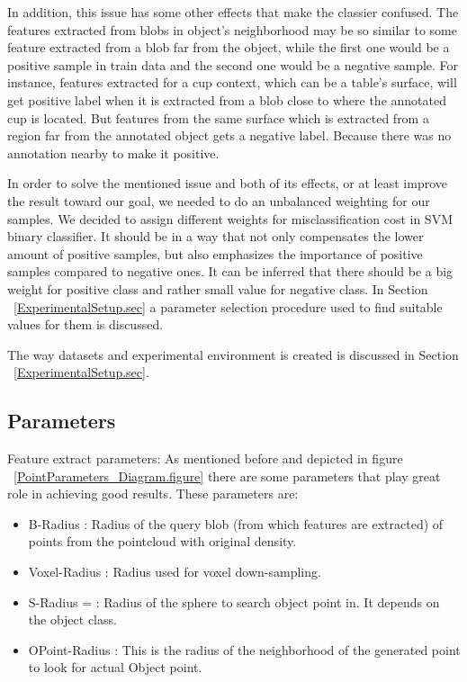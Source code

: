 In addition, this issue has some other effects that make the classier confused. 
The features extracted from blobs in object's neighborhood may be so similar to some feature extracted from a blob far from the 
object, while the first one would be a positive sample in train data and the second one would be a negative sample. 
For instance, features extracted for a cup context, which can be a table's surface, will get positive label when it is extracted 
from a blob close to where the annotated cup is located. 
But features from the same surface which is extracted from a region far from the annotated object gets a negative label.
Because there was no annotation nearby to make it positive. 

In order to solve the mentioned issue and both of its effects, or at least improve the result toward our goal, we needed to do 
an unbalanced weighting for our samples. 
We decided to assign different weights for misclassification cost in SVM binary classifier. 
It should be in a way that not only compensates the lower amount of positive samples, but also emphasizes the importance of 
positive samples compared to negative ones. 
It can be inferred that there should be a big weight for positive class and rather small value for negative class.
In Section ~\ref{ExperimentalSetup.sec} a parameter selection procedure used to find suitable values for them is discussed.      

The way datasets and experimental environment is created is discussed in Section ~\ref{ExperimentalSetup.sec}.


\subsection{Parameters}
\label{Parameters.ssec}

Feature extract parameters:
As mentioned before and depicted in figure ~\ref{PointParameters_Diagram.figure} there are some parameters that play great role in
achieving good results. 
These parameters are:

\begin{itemize}
 \item  B-Radius : Radius of the query blob (from which features are extracted) of points from the pointcloud with original
 density.
 \item Voxel-Radius : Radius used for voxel down-sampling. 
 \item S-Radius = : Radius of the sphere to search object point in. 
 It depends on the object class.
 \item OPoint-Radius : This is the radius of the neighborhood of the generated point to look for actual Object point.
\end{itemize}

